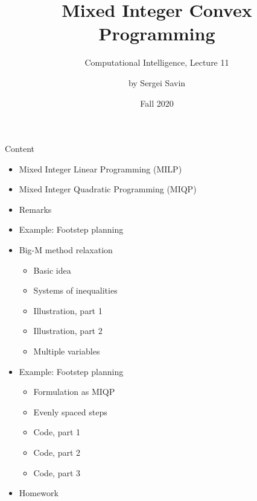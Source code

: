 \documentclass{beamer}
\title{ Mixed Integer Convex Programming }
\subtitle{Computational Intelligence, Lecture 11}
\author{by Sergei Savin}
\date{Fall 2020}
\begin{document}
\maketitle


\begin{frame}{Content}

\begin{itemize}
\item Mixed Integer Linear Programming (MILP)
\item Mixed Integer Quadratic Programming (MIQP)
\item Remarks
\item Example: Footstep planning
\item Big-M method relaxation
\begin{itemize}
    \item Basic idea
    \item Systems of inequalities
    \item Illustration, part 1
    \item Illustration, part 2
    \item Multiple variables
\end{itemize}
\item  Example: Footstep planning
\begin{itemize}
    \item Formulation as MIQP
    \item Evenly spaced steps
    \item Code, part 1
    \item Code, part 2
    \item Code, part 3
\end{itemize}
\item Homework
\end{itemize}

\end{frame}
\end{document}
